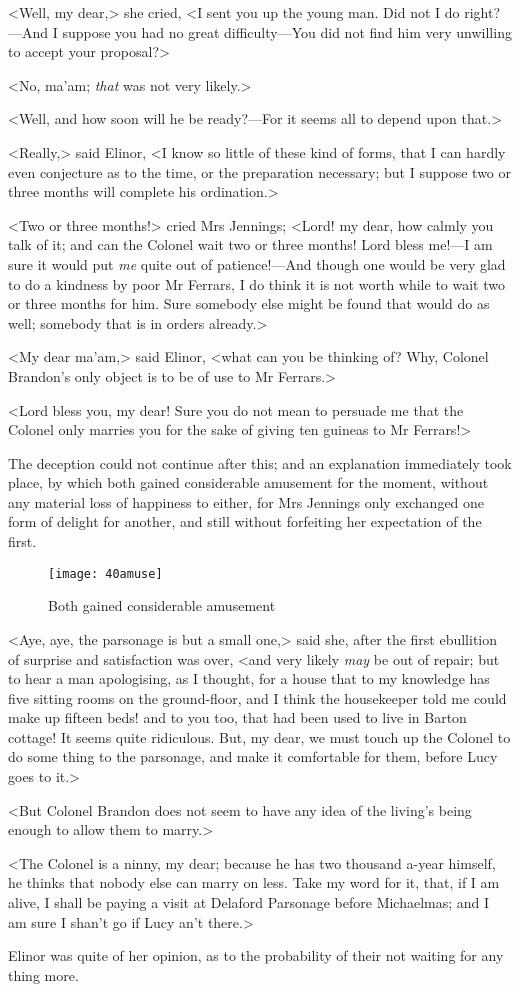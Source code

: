 <Well, my dear,> she cried, <I sent you up the young man. Did not I do right?—And I suppose you had no great difficulty—You did not find him very unwilling to accept your proposal?>

<No, ma'am; \textit{that} was not very likely.>

<Well, and how soon will he be ready?—For it seems all to depend upon that.>

<Really,> said Elinor, <I know so little of these kind of forms, that I can hardly even conjecture as to the time, or the preparation necessary; but I suppose two or three months will complete his ordination.>

<Two or three months!> cried Mrs Jennings; <Lord! my dear, how calmly you talk of it; and can the Colonel wait two or three months! Lord bless me!—I am sure it would put \textit{me} quite out of patience!—And though one would be very glad to do a kindness by poor Mr Ferrars, I do think it is not worth while to wait two or three months for him. Sure somebody else might be found that would do as well; somebody that is in orders already.>

<My dear ma'am,> said Elinor, <what can you be thinking of? Why, Colonel Brandon's only object is to be of use to Mr Ferrars.>

<Lord bless you, my dear! Sure you do not mean to persuade me that the Colonel only marries you for the sake of giving ten guineas to Mr Ferrars!>

The deception could not continue after this; and an explanation immediately took place, by which both gained considerable amusement for the moment, without any material loss of happiness to either, for Mrs Jennings only exchanged one form of delight for another, and still without forfeiting her expectation of the first.

\begin{figure}[tbph]
\centering
\texttt{[image: 40amuse]}
\caption{Both gained considerable amusement}
\end{figure}

<Aye, aye, the parsonage is but a small one,> said she, after the first ebullition of surprise and satisfaction was over, <and very likely \textit{may} be out of repair; but to hear a man apologising, as I thought, for a house that to my knowledge has five sitting rooms on the ground-floor, and I think the housekeeper told me could make up fifteen beds! and to you too, that had been used to live in Barton cottage! It seems quite ridiculous. But, my dear, we must touch up the Colonel to do some thing to the parsonage, and make it comfortable for them, before Lucy goes to it.>

<But Colonel Brandon does not seem to have any idea of the living's being enough to allow them to marry.>

<The Colonel is a ninny, my dear; because he has two thousand a-year himself, he thinks that nobody else can marry on less. Take my word for it, that, if I am alive, I shall be paying a visit at Delaford Parsonage before Michaelmas; and I am sure I shan't go if Lucy an't there.>

Elinor was quite of her opinion, as to the probability of their not waiting for any thing more.